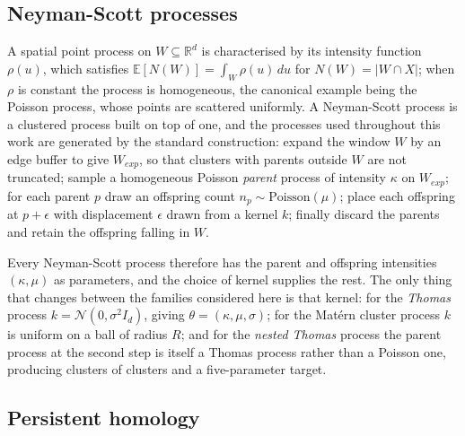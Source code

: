 \documentclass[11pt,a4paper]{article}
\newcommand{\R}{\mathbb{R}}
\newcommand{\E}{\mathbb{E}}
\begin{document}
\subsection{Neyman-Scott processes}
\label{ssec:spp}

A spatial point process on $W \subseteq \R^d$ is characterised by its intensity
function $\rho(u)$, which satisfies $\E[N(W)] = \int_W \rho(u)\,du$ for
$N(W) = |W \cap X|$; when $\rho$ is constant the process is homogeneous, the
canonical example being the Poisson process, whose points are scattered
uniformly. A Neyman-Scott process is a clustered process built on top of one, and
the processes used throughout this work are generated by the standard
construction: expand the window $W$ by an edge buffer to give $W_{exp}$, so that
clusters with parents outside $W$ are not truncated; sample a homogeneous
Poisson \emph{parent} process of intensity $\kappa$ on $W_{exp}$; for each
parent $p$ draw an offspring count $n_p \sim \mathrm{Poisson}(\mu)$; place each
offspring at $p + \epsilon$ with displacement $\epsilon$ drawn from a kernel
$k$; finally discard the parents and retain the offspring falling in $W$.

Every Neyman-Scott process therefore has the parent and offspring intensities
$(\kappa,\mu)$ as parameters, and the choice of kernel supplies the rest. The
only thing that changes between the families considered here is that kernel: for
the \emph{Thomas} process $k = \mathcal{N}(0,\sigma^2 I_d)$, giving
$\theta = (\kappa,\mu,\sigma)$; for the Mat\'ern cluster process $k$ is uniform
on a ball of radius $R$; and for the \emph{nested Thomas} process the parent
process at the second step is itself a Thomas process rather than a Poisson one,
producing clusters of clusters and a five-parameter target.

\subsection{Persistent homology}
\label{ssec:persistence}
\end{document}

